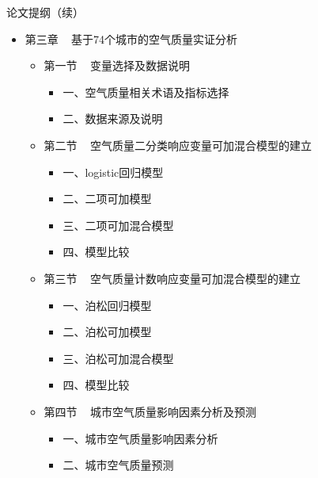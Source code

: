 \documentclass[ignorenonframetext,11pt,xcolor=dvipsnames,aspectratio=1610,hyperref={bookmarksdepth=4}]{beamer}
\providecommand{\tightlist}{%
  \setlength{\itemsep}{0pt}\setlength{\parskip}{0pt}}
\begin{document}
\begin{frame}{论文提纲（续）}

\begin{itemize}
\tightlist
\item
  第三章 ~ 基于74个城市的空气质量实证分析

  \begin{itemize}
  \tightlist
  \item
    第一节 ~ 变量选择及数据说明

    \begin{itemize}
    \tightlist
    \item
      一、空气质量相关术语及指标选择
    \item
      二、数据来源及说明
    \end{itemize}
  \item
    第二节 ~ 空气质量二分类响应变量可加混合模型的建立

    \begin{itemize}
    \tightlist
    \item
      一、logistic回归模型
    \item
      二、二项可加模型
    \item
      三、二项可加混合模型
    \item
      四、模型比较
    \end{itemize}
  \item
    第三节 ~ 空气质量计数响应变量可加混合模型的建立

    \begin{itemize}
    \tightlist
    \item
      一、泊松回归模型
    \item
      二、泊松可加模型
    \item
      三、泊松可加混合模型
    \item
      四、模型比较
    \end{itemize}
  \item
    第四节 ~ 城市空气质量影响因素分析及预测

    \begin{itemize}
    \tightlist
    \item
      一、城市空气质量影响因素分析
    \item
      二、城市空气质量预测
    \end{itemize}
  \end{itemize}
\end{itemize}

\end{frame}
\end{document}
